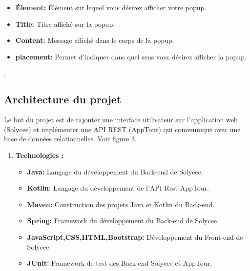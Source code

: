 \documentclass[12pt]{article}
\begin{document}
\begin{itemize}
\item \textbf{Élement: } Élément sur lequel vous désirez afficher votre popup.\footnotemark
\item \textbf{Title: } Titre affiché sur la popup. 
\item \textbf{Content: } Message affiché dans le corps de la popup.
\item \textbf{placement: } Permet d’indiquer dans quel sens vous désirez afficher la popup.
\end{itemize}

.
 



\subsection{Architecture du projet}

Le but du projet est de rajouter une interface utilisateur sur l'application web (Solycee) et implémenter une API REST (AppTour) qui communique avec une base de données relationnelles. Voir figure 3.

\begin{enumerate}
\item \textbf{Technologies :}\\

\begin{itemize}
\item \textbf{Java: }Langage du développement du Back-end de Solycee. 
\item \textbf{Kotlin: }Langage du développement de l'API Rest AppTour. 
\item \textbf{Maven: }Construction des projets Java et Kotlin du Back-end.
\item \textbf{Spring: } Framework du développement du Back-end de Solycee.
\item \textbf{JavaScript,CSS,HTML,Bootstrap: } Développement du Front-end de Solycee.
\item \textbf{JUnit: } Framework de test des Back-end Solycee et AppTour. 
\end{itemize} 
\end{enumerate}
\end{document}
